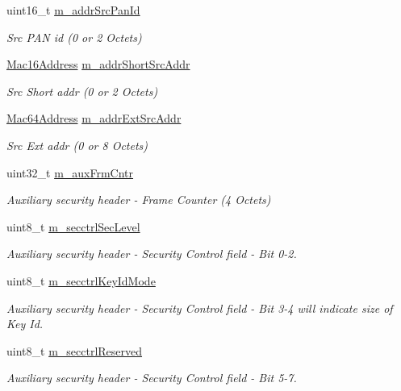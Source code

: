 \begin{DoxyCompactItemize}
uint16\+\_\+t \hyperlink{classns3_1_1LrWpanMacHeader_adabd028d2effb51fc5fa520a702d2e26}{m\+\_\+addr\+Src\+Pan\+Id}
\begin{DoxyCompactList}\small\item\em Src P\+AN id (0 or 2 Octets) \end{DoxyCompactList}\item 
\hyperlink{classns3_1_1Mac16Address}{Mac16\+Address} \hyperlink{classns3_1_1LrWpanMacHeader_a1ca627838e4560440e4459d6ccaa17e1}{m\+\_\+addr\+Short\+Src\+Addr}
\begin{DoxyCompactList}\small\item\em Src Short addr (0 or 2 Octets) \end{DoxyCompactList}\item 
\hyperlink{classns3_1_1Mac64Address}{Mac64\+Address} \hyperlink{classns3_1_1LrWpanMacHeader_acf0719238046dd4bd43b3f3c86dc0edd}{m\+\_\+addr\+Ext\+Src\+Addr}
\begin{DoxyCompactList}\small\item\em Src Ext addr (0 or 8 Octets) \end{DoxyCompactList}\item 
uint32\+\_\+t \hyperlink{classns3_1_1LrWpanMacHeader_a02e8f1ea52afd29eb1e7566792922fef}{m\+\_\+aux\+Frm\+Cntr}
\begin{DoxyCompactList}\small\item\em Auxiliary security header -\/ Frame Counter (4 Octets) \end{DoxyCompactList}\item 
uint8\+\_\+t \hyperlink{classns3_1_1LrWpanMacHeader_a00e41e9c9cefeeac16a515dc53456fdc}{m\+\_\+secctrl\+Sec\+Level}
\begin{DoxyCompactList}\small\item\em Auxiliary security header -\/ Security Control field -\/ Bit 0-\/2. \end{DoxyCompactList}\item 
uint8\+\_\+t \hyperlink{classns3_1_1LrWpanMacHeader_a9267670950a142f87c0b48ec4cc20236}{m\+\_\+secctrl\+Key\+Id\+Mode}
\begin{DoxyCompactList}\small\item\em Auxiliary security header -\/ Security Control field -\/ Bit 3-\/4 will indicate size of Key Id. \end{DoxyCompactList}\item 
uint8\+\_\+t \hyperlink{classns3_1_1LrWpanMacHeader_a22584b58f0abc5d1aebe29cb020a7189}{m\+\_\+secctrl\+Reserved}
\begin{DoxyCompactList}\small\item\em Auxiliary security header -\/ Security Control field -\/ Bit 5-\/7. \end{DoxyCompactList}\item 

\end{DoxyCompactItemize}
